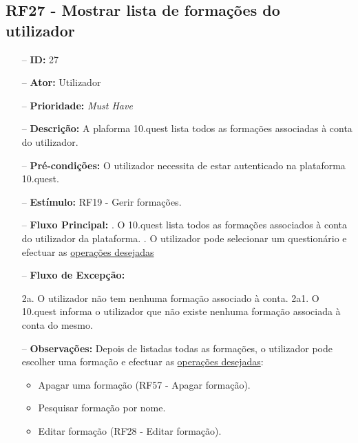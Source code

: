 \subsection{RF27 - Mostrar lista de formações do utilizador}
\begin{itemize}
	\item[--] \textbf{ID:} 27
	\item[--]  \textbf{Ator:} Utilizador
	\item[--]  \textbf{Prioridade:} \textit{Must Have}
	\item[--]  \textbf{Descrição:} A plaforma 10.quest lista todos as formações associadas à conta do utilizador.
	\item[--]  \textbf{Pré-condições:} O utilizador necessita de estar autenticado na plataforma 10.quest.
	\item[--]  \textbf{Estímulo:} RF19 - Gerir formações.
	\item[--]  \textbf{Fluxo Principal:} 
		. O 10.quest lista todos as formações associados à conta do utilizador da plataforma.
		. O utilizador pode selecionar um questionário e efectuar as \underline{operações desejadas}
	\item[--]  \textbf{Fluxo de Excepção:} 
		\begin{comment}
		\subitem 1. O 10.quest efetua um pedido da lista de formações associados à conta do utilizador, ao TCG.
		\subitem 1a. O 10.quest não consegue efetuar o pedido à API do TCG devido a uma falha na conexão.
		\subitem 1a1. O 10.quest notifica o utilizador que ocorreu uma falha na conexão.
		\subitem 1b. O serviço do TCG (API) está indisponível.
		\subitem 1b1. O 10.quest notifica o utilizador que o serviço do TCG está temporariamente indisponível. 
		\end{comment}
		\subitem 2a. O utilizador não tem nenhuma formação associado à conta.
		\subitem 2a1. O 10.quest informa o utilizador que não existe nenhuma formação associada à conta do mesmo.
	\item[--]  \textbf{Observações:} Depois de listadas todas as formações, o utilizador pode escolher uma formação e efectuar as \underline{operações desejadas}:
	\begin{itemize}
		\item Apagar uma formação (RF57 - Apagar formação).
		\item Pesquisar formação por nome.
		\item Editar formação (RF28 - Editar formação).
	\end{itemize}
\end{itemize}
\newpage

